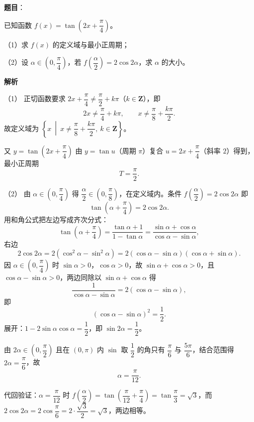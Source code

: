 \begin{answer}

\textbf{题目}：

已知函数 $f(x)=\tan\left(2x+\dfrac{\pi}{4}\right)$。

（1）求 $f(x)$ 的定义域与最小正周期；

（2）设 $\alpha\in\left(0,\dfrac{\pi}{4}\right)$，若 $f\left(\dfrac{\alpha}{2}\right)=2\cos2\alpha$，求 $\alpha$ 的大小。

\textbf{解析}

（1） 正切函数要求 $2x+\dfrac{\pi}{4}\neq\dfrac{\pi}{2}+k\pi$（$k\in\mathbf{Z}$），即
\nopagebreak[4]
\[2x\neq\frac{\pi}{4}+k\pi,\qquad x\neq\frac{\pi}{8}+\frac{k\pi}{2}.\]
故定义域为 $\left\{x\ \middle|\ x\neq\dfrac{\pi}{8}+\dfrac{k\pi}{2},\ k\in\mathbf{Z}\right\}$。

又 $y=\tan\left(2x+\dfrac{\pi}{4}\right)$ 由 $y=\tan u$（周期 $\pi$）复合 $u=2x+\dfrac{\pi}{4}$（斜率 $2$）得到，最小正周期
\nopagebreak[4]
\[T=\frac{\pi}{2}.\]

（2） 由 $\alpha\in\left(0,\dfrac{\pi}{4}\right)$ 得 $\dfrac{\alpha}{2}\in\left(0,\dfrac{\pi}{8}\right)$，在定义域内。条件 $f\left(\dfrac{\alpha}{2}\right)=2\cos2\alpha$ 即
\nopagebreak[4]
\[\tan\left(\alpha+\frac{\pi}{4}\right)=2\cos2\alpha.\]
用和角公式把左边写成齐次分式：
\nopagebreak[4]
\[\tan\left(\alpha+\frac{\pi}{4}\right)=\frac{\tan\alpha+1}{1-\tan\alpha}=\frac{\sin\alpha+\cos\alpha}{\cos\alpha-\sin\alpha},\]
右边
\nopagebreak[4]
\[2\cos2\alpha=2\left(\cos^2\alpha-\sin^2\alpha\right)=2(\cos\alpha-\sin\alpha)(\cos\alpha+\sin\alpha).\]
因 $\alpha\in\left(0,\dfrac{\pi}{4}\right)$ 时 $\sin\alpha>0$，$\cos\alpha>0$，故 $\sin\alpha+\cos\alpha>0$，且 $\cos\alpha-\sin\alpha>0$，两边同除以 $\sin\alpha+\cos\alpha$ 得
\nopagebreak[4]
\[\frac{1}{\cos\alpha-\sin\alpha}=2(\cos\alpha-\sin\alpha),\]
即
\nopagebreak[4]
\[(\cos\alpha-\sin\alpha)^2=\frac12.\]
展开：$1-2\sin\alpha\cos\alpha=\dfrac12$，即 $\sin2\alpha=\dfrac12$。

由 $2\alpha\in\left(0,\dfrac{\pi}{2}\right)$ 且在 $(0,\pi)$ 内 $\sin$ 取 $\dfrac12$ 的角只有 $\dfrac{\pi}{6}$ 与 $\dfrac{5\pi}{6}$，结合范围得 $2\alpha=\dfrac{\pi}{6}$，故
\nopagebreak[4]
\[\alpha=\frac{\pi}{12}.\]

代回验证：$\alpha=\dfrac{\pi}{12}$ 时 $f\left(\dfrac{\alpha}{2}\right)=\tan\left(\dfrac{\pi}{12}+\dfrac{\pi}{4}\right)=\tan\dfrac{\pi}{3}=\sqrt3$，而 $2\cos2\alpha=2\cos\dfrac{\pi}{6}=2\cdot\dfrac{\sqrt3}{2}=\sqrt3$，两边相等。


\end{answer}
